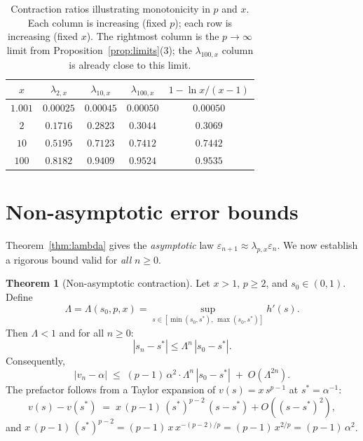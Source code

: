 \documentclass[11pt,a4paper]{article}
\theoremstyle{definition}
\newtheorem{theorem}{Theorem}[section]
\newcommand{\eps}{\varepsilon}
\begin{document}
\begin{table}[h]
\centering
\begin{tabular}{ccccc}
\toprule
$x$ & $\lambda_{2,x}$ & $\lambda_{10,x}$ & $\lambda_{100,x}$ & $1 - \ln x / (x-1)$ \\
\midrule
$1.001$ & $0.00025$ & $0.00045$ & $0.00050$ & $0.00050$ \\
$2$ & $0.1716$ & $0.2823$ & $0.3044$ & $0.3069$ \\
$10$ & $0.5195$ & $0.7123$ & $0.7412$ & $0.7442$ \\
$100$ & $0.8182$ & $0.9409$ & $0.9524$ & $0.9535$ \\
\bottomrule
\end{tabular}
\caption{Contraction ratios illustrating monotonicity in $p$ and $x$. Each column is increasing (fixed $p$); each row is increasing (fixed $x$). The rightmost column is the $p \to \infty$ limit from Proposition~\ref{prop:limits}(3); the $\lambda_{100,x}$ column is already close to this limit.}
\end{table}

\section{Non-asymptotic error bounds}
\label{sec:nonasymptotic}

Theorem~\ref{thm:lambda} gives the \emph{asymptotic} law $\eps_{n+1} \approx \lambda_{p,x} \eps_n$. We now establish a rigorous bound valid for \emph{all} $n \geq 0$.

\begin{theorem}[Non-asymptotic contraction]
\label{thm:nonasymp}
Let $x > 1$, $p \geq 2$, and $s_0 \in (0,1)$. Define
\[
  \Lambda = \Lambda(s_0, p, x) = \sup_{s \in [\min(s_0, s^*),\, \max(s_0, s^*)]} h'(s).
\]
Then $\Lambda < 1$ and for all $n \geq 0$:
\begin{equation}
  \label{eq:nonasymp_bound}
  |s_n - s^*| \leq \Lambda^n \, |s_0 - s^*|.
\end{equation}
Consequently,
\[
  |v_n - \alpha| \;\leq\; (p-1)\,\alpha^2 \cdot \Lambda^n\, |s_0 - s^*| \;+\; O(\Lambda^{2n}).
\]
The prefactor follows from a Taylor expansion of $v(s) = x\, s^{p-1}$ at $s^* = \alpha^{-1}$:
\[
  v(s) - v(s^*) \;=\; x\,(p-1)\,(s^*)^{p-2}\,(s - s^*) + O((s - s^*)^2),
\]
and $x\,(p-1)\,(s^*)^{p-2} = (p-1)\, x\, x^{-(p-2)/p} = (p-1)\, x^{2/p} = (p-1)\,\alpha^2$.
\end{theorem}
\end{document}
